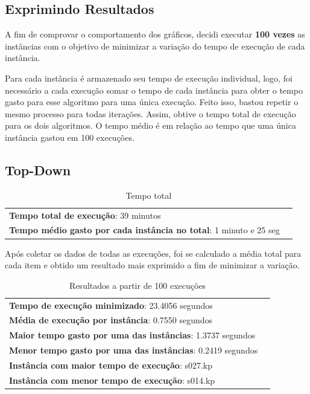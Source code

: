 \documentclass[a4paper, 12pt]{article}
\begin{document}
\subsection{Exprimindo Resultados}
A fim de comprovar o comportamento dos gráficos, decidi executar {\bf 100 vezes} as instâncias com o objetivo de minimizar
a variação do tempo de execução de cada instância.

Para cada instância é armazenado seu tempo de execução individual, logo, foi necessário a cada execução somar o tempo
de cada instância para obter o tempo gasto para esse algoritmo para uma única execução. Feito isso, bastou
repetir o mesmo processo para todas iterações. Assim, obtive o tempo total de execução para os dois algoritmos. O tempo
médio é em relação ao tempo que uma única instância gastou em 100 execuções.
\subsection{Top-Down}
\begin{table}[!htb]
    \begin{tabular}{ll}
        {\bf Tempo total de execução}: 39 minutos\\
        {\bf Tempo médio gasto por cada instância no total}: 1 minuto e 25 seg
    \end{tabular}
    \caption{Tempo total}
    \label{tab:total_topdown}
\end{table}

Após coletar os dados de todas as execuções, foi se calculado a média total para cada item e obtido um resultado 
mais exprimido a fim de minimizar a variação.
\begin{table}[!htb]
    \begin{tabular}{ll}
        {\bf Tempo de execução minimizado}: 23.4056 segundos\\
        {\bf Média de execução por instância}: 0.7550 segundos\\
        {\bf Maior tempo gasto por uma das instâncias}: 1.3737 segundos\\
        {\bf Menor tempo gasto por uma das instâncias}: 0.2419 segundos \\
        {\bf Instância com maior tempo de execução}: s027.kp\\
        {\bf Instância com menor tempo de execução}: s014.kp
    \end{tabular}
    \caption{Resultados a partir de 100 execuções}
    \label{tab:result_tot_topdown}
\end{table}
\end{document}
